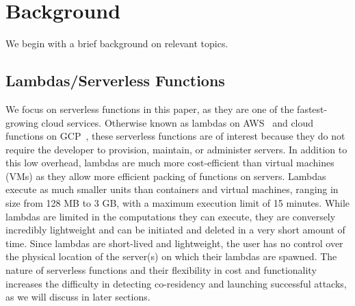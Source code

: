 \section{Background}
\label{sec:background}

We begin with a brief background on relevant topics.

\subsection{Lambdas/Serverless Functions} 
\label{sec:background:lambdas}
We focus on serverless functions in this paper, as they are one of the
fastest-growing cloud services. Otherwise known as lambdas on
AWS~\cite{awslambda} and cloud functions on GCP~\cite{gcpfunctions}, these
serverless functions are of interest because they do not require the developer
to provision, maintain, or administer servers. In addition to this low overhead,
lambdas are much more cost-efficient than virtual machines (VMs) as they allow
more efficient packing of functions on servers. Lambdas execute as much smaller
units than containers and virtual machines, ranging in size from 128 MB to 3 GB,
with a maximum execution limit of 15 minutes. While lambdas are limited in the
computations they can execute, they are conversely incredibly lightweight and
can be initiated and deleted in a very short amount of time. Since lambdas are
short-lived and lightweight, the user has no control over the physical location
of the server(s) on which their lambdas are spawned.  The nature of serverless
functions and their flexibility in cost and functionality increases the
difficulty in detecting co-residency and launching successful attacks, as we
will discuss in later sections.



